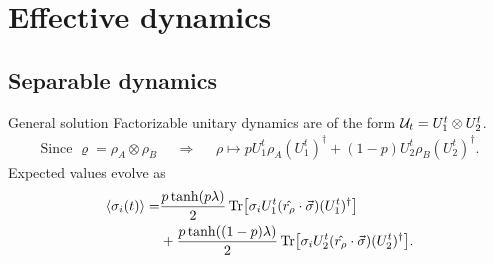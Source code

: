 \section{Effective dynamics}

\subsection{Separable dynamics}

\begin{frame}{General solution}
    Factorizable unitary dynamics are of the form $\mathcal{U}_{t}=U_{1}^{t}\otimes U_{2}^{t}$.
    \begin{align*}
        \text{Since } \varrho=\rho_{A}\otimes\rho_{B} & & \Longrightarrow & &\rho\mapsto pU_{1}^{t}\rho_{A}(U_{1}^{t})^{\dag}+(1-p)U_{2}^{t}\rho_{B} (U_{2}^{t})^{\dag}.
    \end{align*}
    Expected values evolve as
    \begin{align*}
        \begin{split}
            \expval{\sigma_{i}(t)}=&\frac{p\tanh(p\lambda)}{2}\Tr[\sigma_{i}U_{1}^{t}(\hat{r_{\rho}}\cdot\vec{\sigma})(U_{1}^{t})^{\dag}]\\
        &+\frac{p\tanh((1-p)\lambda)}{2}\Tr[\sigma_{i}U_{2}^{t}(\hat{r_{\rho}}\cdot\vec{\sigma})(U_{2}^{t})^{\dag}].
        \end{split}
      \end{align*}
\end{frame}


